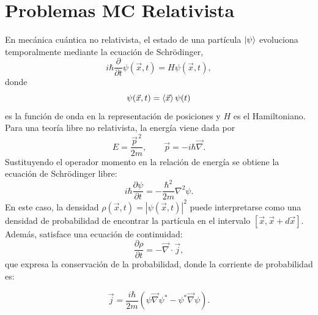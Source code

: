 \documentclass[a4paper,11pt]{book} %
\begin{document}
\section{Problemas MC Relativista}
\noindent
En mecánica cuántica no relativista, el estado de una partícula
$\ket{\psi}$ evoluciona temporalmente mediante la ecuación de Schrödinger,
\begin{equation}
    i\hbar \frac{\partial}{\partial t}\psi(\vec{x},t)
    =
    H\psi(\vec{x},t),
\end{equation}
\noindent
donde
\begin{equation}
    \psi(\vec{x},t)
    =
    \braket{\vec{x}}{\psi(t)}
\end{equation}
\noindent
es la función de onda en la representación de posiciones y \(H\) es el
Hamiltoniano.
\medskip\newline
Para una teoría libre no relativista, la energía viene dada por
\begin{equation}
    E = \frac{\vec{p}^{\,2}}{2m},
    \qquad
    \vec{p} = -i\hbar \vec{\nabla}.
\end{equation}
\noindent
Sustituyendo el operador momento en la relación de energía se obtiene la
ecuación de Schrödinger libre:
\begin{equation}
    i\hbar \frac{\partial \psi}{\partial t}
    =
    -\frac{\hbar^2}{2m}\nabla^2\psi.
\end{equation}
En este caso, la densidad $\rho(\vec{x},t)=|\psi(\vec{x},t)|^2$ puede interpretarse como una densidad de probabilidad de encontrar la partícula
en el intervalo \([\vec{x},\vec{x}+d\vec{x}]\). 
\medskip\newline
Además, satisface una ecuación de continuidad:
\begin{equation}
    \frac{\partial \rho}{\partial t}
    =
    -\vec{\nabla}\cdot \vec{j},
\end{equation}
que expresa la conservación de la probabilidad, donde la corriente de probabilidad es:

\begin{equation}
    \vec{j}
    =
    \frac{i\hbar}{2m}
    \left(
        \psi \vec{\nabla}\psi^*
        -
        \psi^*\vec{\nabla}\psi
    \right).
\end{equation}
\end{document}
